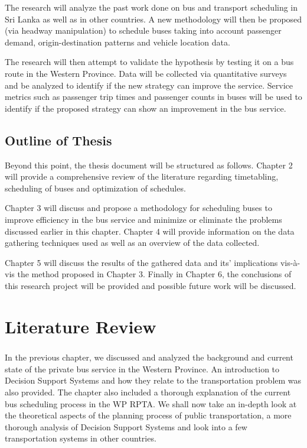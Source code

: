 \documentclass[12pt, oneside]{report}
\begin{document}
The research will analyze the past work done on bus and transport scheduling in Sri Lanka as well as in other countries. A new methodology will then be proposed (via headway manipulation) to schedule buses taking into account passenger demand, origin-destination patterns and vehicle location data.

The research will then attempt to validate the hypothesis by testing it on a bus route in the Western Province. Data will be collected via quantitative surveys and be analyzed to identify if the new strategy can improve the service. Service metrics such as passenger trip times and passenger counts in buses will be used to identify if the proposed strategy can show an improvement in the bus service.

\newpage

\section{Outline of Thesis}
\label{section-OutlineOfThesis}

Beyond this point, the thesis document will be structured as follows. Chapter 2 will provide a comprehensive review of the literature regarding timetabling, scheduling of buses and optimization of schedules. 

Chapter 3 will discuss and propose a methodology for scheduling buses to improve efficiency in the bus service and minimize or eliminate the problems discussed earlier in this chapter. Chapter 4 will provide information on the data gathering techniques used as well as an overview of the data collected.

Chapter 5 will discuss the results of the gathered data and its’ implications vis-\`{a}-vis the method proposed in Chapter 3. Finally in Chapter 6, the conclusions of this research project will be provided and possible future work will be discussed.

\newpage


\chapter {Literature Review}
\label{chapter-LitReview}

\paragraph{ } In the previous chapter, we discussed and analyzed the background and current state of the private bus service in the Western Province. An introduction to Decision Support Systems and how they relate to the transportation problem was also provided. The chapter also included a thorough explanation of the current bus scheduling process in the WP RPTA. We shall now take an in-depth look at the theoretical aspects of the planning process of public transportation, a more thorough analysis of Decision Support Systems and look into a few transportation systems in other countries.
\end{document}
